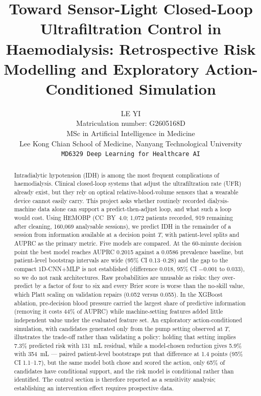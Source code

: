 \documentclass{article}
\title{Toward Sensor-Light Closed-Loop Ultrafiltration Control in Haemodialysis: Retrospective Risk Modelling and Exploratory Action-Conditioned Simulation}
\author{%
  LE YI \\
  Matriculation number: G2605168D \\
  MSc in Artificial Intelligence in Medicine \\
  Lee Kong Chian School of Medicine, Nanyang Technological University \\
  \texttt{MD6329 Deep Learning for Healthcare AI} \\
}
\begin{document}
\makeatletter
\renewcommand{\@noticestring}{Course project report, MD6329 Deep Learning for Healthcare AI, NTU LKCMedicine, 2026.}
\makeatother
\maketitle

\begin{abstract}
Intradialytic hypotension (IDH) is among the most frequent complications of haemodialysis. Clinical
closed-loop systems that adjust the ultrafiltration rate (UFR) already exist, but they rely on optical
relative-blood-volume sensors that a wearable device cannot easily carry. This project asks whether
routinely recorded dialysis-machine data alone can support a predict-then-adjust loop, and what such a
loop would cost. Using HEMOBP (CC~BY~4.0; 1{,}072 patients recorded, 919 remaining after cleaning,
160{,}069 analysable sessions), we predict IDH in the remainder of a session from information available
at a decision point $T$, with patient-level splits and AUPRC as the primary metric. Five models are
compared. At the 60-minute decision point the best model reaches AUPRC 0.2015 against a 0.0586 prevalence baseline, but
patient-level bootstrap intervals are wide (95\% CI 0.13--0.28) and the gap to the compact 1D-CNN+MLP
is not established (difference 0.018, 95\% CI $-0.001$ to 0.033), so we do not rank architectures. Raw
probabilities are unusable as risks: they over-predict by a factor of four to six and every Brier score
is worse than the no-skill value, which Platt scaling on validation repairs (0.052 versus 0.055).
In the XGBoost ablation, pre-decision blood pressure carried the largest share of predictive information (removing it
costs 44\% of AUPRC) while machine-setting features added little independent value under the evaluated feature set. An exploratory action-conditioned
simulation, with candidates generated only from the pump setting observed at $T$, illustrates the
trade-off rather than validating a policy: holding that setting implies 7.3\% predicted risk with
131~mL residual, while a model-chosen reduction gives 5.9\% with 354~mL --- paired patient-level bootstraps put that
difference at 1.4 points (95\% CI 1.1--1.7), but the same model both chose and scored the action, only 65\% of candidates
have conditional support, and the risk model is conditional rather than identified. The control section is
therefore reported as a sensitivity analysis; establishing an intervention effect requires
prospective data.

\end{abstract}
\end{document}
